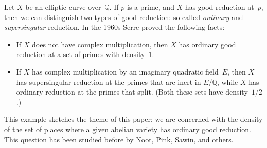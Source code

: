 \documentclass{amsart}
\begin{document}
Let $X$ be an elliptic curve over~$\mathbb{Q}$.
If $p$ is a prime, and $X$ has good reduction at~$p$,
then we can distinguish two types of good reduction:
so called \emph{ordinary} and \emph{supersingular} reduction.
In the 1960s %
Serre proved the following facts:
\begin{itemize}
 \item If $X$ does not have complex multiplication,
  then $X$ has ordinary good reduction at
  a set of primes with density~$1$.
 \item If $X$ has complex multiplication by an
  imaginary quadratic field~$E$,
  then $X$ has supersingular reduction
  at the primes that are inert in $E/\mathbb{Q}$,
  while $X$ has ordinary reduction at the primes that split.
  (Both these sets have density~$1/2$.)
\end{itemize}
This example sketches the theme of this paper:
we are concerned with the density of the set of places
where a given abelian variety has ordinary good reduction.
This question has been studied before by
Noot, Pink, Sawin, and others.

\printbibliography
\end{document}
